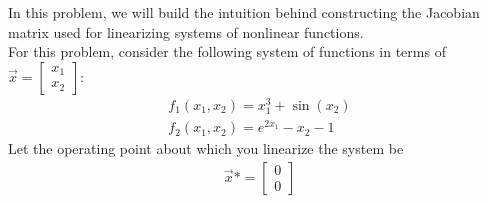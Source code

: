 

In this problem, we will build the intuition behind constructing the Jacobian matrix used for linearizing systems of nonlinear functions. \\
\newline
For this problem, consider the following system of functions in terms of $\vec{x} = \begin{bmatrix} x_1 \\ x_2 \end{bmatrix}$:
\begin{align*}
    f_1(x_1, x_2) = x_1^3 + \sin(x_2) \\
    f_2(x_1, x_2) = e^{2x_1} - x_2 - 1
\end{align*}
Let the operating point about which you linearize the system be
\begin{align*}
    \vec{x}* = \begin{bmatrix} 0 \\ 0 \end{bmatrix}
\end{align*}

